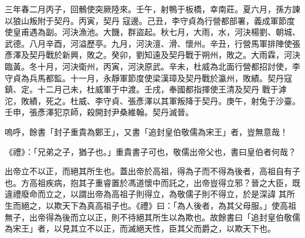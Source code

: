 \begin{pinyinscope}
 三年春二月丙子，回鶻使突厥陸來。壬午，射鴨于板橋，幸南莊。夏六月，孫方諫以狼山叛附于契丹。丙寅，契丹
 寇邊。己丑，李守貞為行營都部署，義成軍節度使皇甫遇為副。河決漁池。大饑，群盜起。秋七月，大雨，水，河決楊劉、朝城、武德。八月辛酉，河溢歷亭。九月，河決澶、滑、懷州。辛丑，行營馬軍排陣使張彥澤及契丹戰於新興，敗之。癸卯，劉知遠及契丹戰于朔州，敗之。大雨霖，河決臨黃。冬十月，河決衛州，丙寅，河決原武。辛未，杜威為北面行營都招討使，李守貞為兵馬都監。十一月，永靜軍節度使梁漢璋及契丹戰於瀛州，敗績。契丹寇鎮、定。十二月己未，杜威軍于中渡。壬戌，奉國都指揮使王清及契丹
 戰于滹沱，敗績，死之。杜威、李守貞、張彥澤以其軍叛降于契丹。庚午，射兔于沙臺。壬申，張彥澤犯京師，殺開封尹桑維翰。契丹滅晉。



 嗚呼，餘書「封子重貴為鄭王」，又書「追封皇伯敬儒為宋王」者，豈無意哉！



 《禮》：「兄弟之子，猶子也。」重貴書子可也，敬儒出帝父也，書曰皇伯者何哉？



 出帝立不以正，而絕其所生也。蓋出帝於高祖，得為子而不得為後者，高祖自有子也。方高祖疾病，抱其子重睿置於馮道懷中而託之，出帝豈得立邪？晉之大臣，既違禮廢命而立之，以謂出帝為高祖子則得立，為敬儒子則不得立，於是深諱
 其所生而絕之，以欺天下為真高祖子也。《禮》曰：「為人後者，為其父母服。」使高祖無子，出帝得為後而立以正，則不待絕其所生以為欺也。故餘書曰「追封皇伯敬儒為宋王」者，以見其立不以正，而滅絕天性，臣其父而爵之，以欺天下也。



\end{pinyinscope}